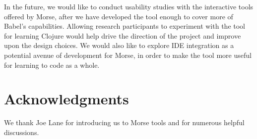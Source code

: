\documentclass[12pt]{article}
\begin{document}
In the future, we would like to conduct usability studies with the interactive tools offered by Morse, after we have developed the tool enough to cover more of Babel's capabilities. Allowing research participants to experiment with the tool for learning Clojure would help drive the direction of the project and improve upon the design choices. We would also like to explore IDE integration as a potential avenue of development for Morse, in order to make the tool more useful for learning to code as a whole.

\section{Acknowledgments}\label{sec:ack}
We thank Joe Lane for introducing us to Morse tools and for numerous helpful discussions. 



\end{document}
